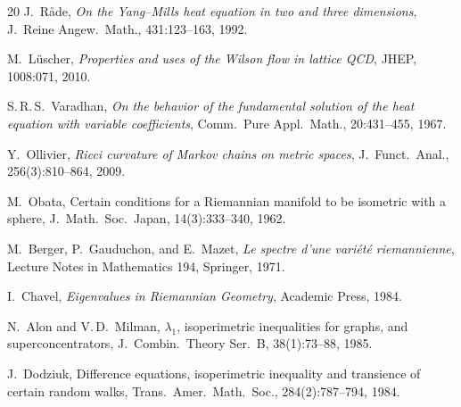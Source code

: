\documentclass[11pt]{article}
\theoremstyle{definition}
\theoremstyle{remark}
\begin{document}
\begin{thebibliography}{20}
J.\ R\aa de,
\emph{On the Yang--Mills heat equation in two and three dimensions},
J.\ Reine Angew.\ Math., 431:123--163, 1992.

M.\ L\"{u}scher,
\emph{Properties and uses of the Wilson flow in lattice QCD},
JHEP, 1008:071, 2010.

S.\,R.\,S.\ Varadhan,
\emph{On the behavior of the fundamental solution of the heat equation with variable coefficients},
Comm.\ Pure Appl.\ Math., 20:431--455, 1967.

Y.\ Ollivier,
\emph{Ricci curvature of Markov chains on metric spaces},
J.\ Funct.\ Anal., 256(3):810--864, 2009.

M.\ Obata,
Certain conditions for a Riemannian manifold to be isometric with a sphere,
J.\ Math.\ Soc.\ Japan, 14(3):333--340, 1962.

M.\ Berger, P.\ Gauduchon, and E.\ Mazet,
\emph{Le spectre d'une vari\'{e}t\'{e} riemannienne},
Lecture Notes in Mathematics 194, Springer, 1971.

I.\ Chavel,
\emph{Eigenvalues in Riemannian Geometry},
Academic Press, 1984.

N.\ Alon and V.\,D.\ Milman,
$\lambda_1$, isoperimetric inequalities for graphs, and superconcentrators,
J.\ Combin.\ Theory Ser.\ B, 38(1):73--88, 1985.

J.\ Dodziuk,
Difference equations, isoperimetric inequality and transience of certain random walks,
Trans.\ Amer.\ Math.\ Soc., 284(2):787--794, 1984.

\end{thebibliography}
\end{document}
